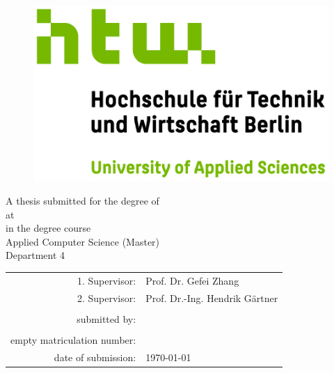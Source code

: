 \begin{titlepage}
		\begin{center}
		\begin{figure}[h]
			
				\hfill
				\begin{minipage}[hbt]{6cm}
				\includegraphics[scale=1.3]{images/htw_logo_rgb.jpg}
				
				\end{minipage}
			\end{figure}
			\vfill
			{\Large \textbf {\thesisTitle}\par}
			\vskip 0.5cm
			
			{\large A thesis submitted for the degree of\\ \bfseries \gradeType}
			\vskip 0.5cm
			{\large at}
			\vskip 0.5cm
			\large \universityName\\ 
			in the degree course\\
			Applied Computer Science (Master)\\
			Department 4\\
			\vfill{}
			\begin{flushleft}
				\begin{tabular}[t]{rl}
					1. Supervisor: &Prof. Dr. Gefei Zhang\\
					2. Supervisor: &Prof. Dr.-Ing. Hendrik Gärtner\\
					\\
					submitted by: &\thesisAuthor\\
					\ifx\\empty
					\else
					matriculation number: & \matrNumber\\
					\fi
					date of submission: & \today
				\end{tabular}
			\end{flushleft}
		\end{center}
		\restoregeometry
	\end{titlepage}


